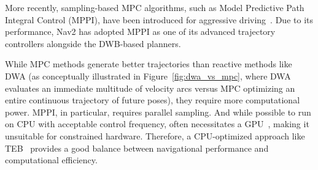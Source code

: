 More recently, sampling-based MPC algorithms, such as Model Predictive Path Integral Control (MPPI), have been introduced for aggressive driving~\cite{williams2016mppi}. Due to its performance, Nav2 has adopted MPPI as one of its advanced trajectory controllers alongside the DWB-based planners.

While MPC methods generate better trajectories than reactive methods like DWA (as conceptually illustrated in Figure~\ref{fig:dwa_vs_mpc}, where DWA evaluates an immediate multitude of velocity arcs versus MPC optimizing an entire continuous trajectory of future poses), they require more computational power. MPPI, in particular, requires parallel sampling. And while possible to run on CPU with acceptable control frequency, often necessitates a GPU~\cite{app15169114}, making it unsuitable for constrained hardware. Therefore, a CPU-optimized approach like TEB~\cite{rosmann2013sparse} provides a good balance between navigational performance and computational efficiency.

